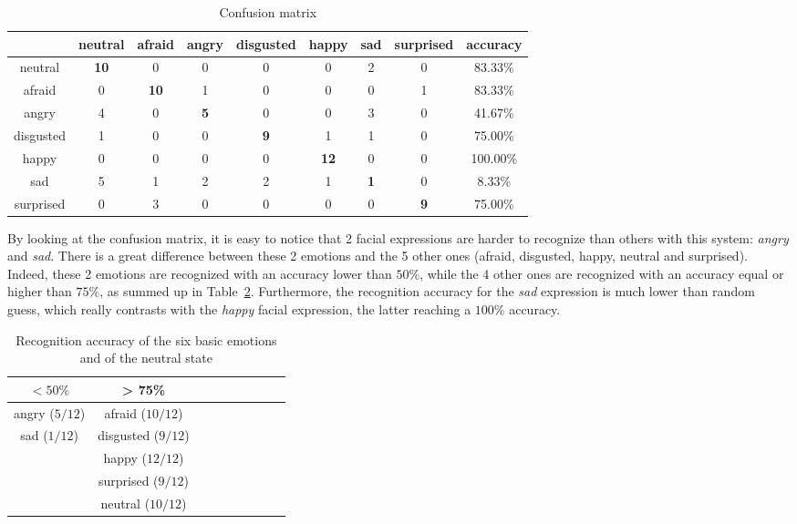 \begin{table}[h]
\begin{center}
   \caption{\label{table_results_confusion_matrix} Confusion matrix}
\begin{tabular}{|c|c|c|c|c|c|c|c|c|}
  \hline
   & neutral & afraid & angry & disgusted & happy & sad & surprised & accuracy \\
  \hline
  neutral & \textbf{10} & 0 & 0 & 0 & 0 & 2 & 0 & 83.33\% \\
  afraid & 0 & \textbf{10} & 1 & 0 & 0 & 0 & 1 & 83.33\% \\
  angry & 4 & 0 & \textbf{5} & 0 & 0 & 3 & 0 & 41.67\% \\
  disgusted & 1 & 0 & 0 & \textbf{9} & 1 & 1 & 0 & 75.00\% \\
  happy & 0 & 0 & 0 & 0 & \textbf{12} & 0 & 0 & 100.00\% \\
  sad & 5 & 1 & 2 & 2 & 1 & \textbf{1} & 0 & 8.33\% \\
  surprised & 0 & 3 & 0 & 0 & 0 & 0 & \textbf{9} & 75.00\%\\
  \hline
\end{tabular}
\end{center}
\end{table}

\noindent By looking at the confusion matrix, it is easy to notice that 2 facial expressions are harder to recognize than others with this system: \textit{angry} and \textit{sad}. There is a great difference between these 2 emotions and the 5 other ones (afraid, disgusted, happy, neutral and surprised). Indeed, these 2 emotions are recognized with an accuracy lower than $ 50\% $, while the 4 other ones are recognized with an accuracy equal or higher than $ 75\% $, as summed up in Table~\ref{table_results_accuracy}. Furthermore, the recognition accuracy for the \textit{sad} expression is much lower than random guess, which really contrasts with the \textit{happy} facial expression, the latter reaching a $100\%$ accuracy.
\newline

\begin{table}[h]
\begin{center}
   \caption{\label{table_results_accuracy} Recognition accuracy of the six basic emotions and of the neutral state}
\begin{tabular}{|c|c|c|c|c|c|c|c|c|}
  \hline
   $ < 50\% $ & > 75\% \\
  \hline
  angry ($ 5/12 $) & afraid ($ 10/12 $) \\
  sad ($ 1/12 $) & disgusted ($ 9/12 $) \\
   & happy ($ 12/12 $) \\
   & surprised ($ 9/12 $) \\
   & neutral ($ 10/12 $) \\
  \hline
\end{tabular}
\end{center} 
\end{table}

